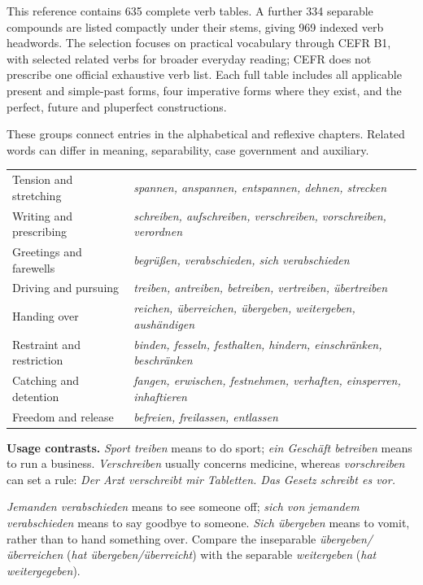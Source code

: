 \begin{tcolorbox}[colback=referenceBlueBg,colframe=genderMasculine,title={B1 coverage note}]
This reference contains 635 complete verb tables. A further 334 separable
compounds are listed compactly under their stems, giving 969 indexed verb
headwords. The selection focuses on practical vocabulary through CEFR B1,
with selected related verbs for broader everyday reading; CEFR
does not prescribe one official exhaustive verb list. Each full table includes
all applicable present and simple-past forms, four imperative forms where they
exist, and the perfect, future and pluperfect constructions.
\end{tcolorbox}

\begin{tcolorbox}[colback=white,colframe=genderMasculine,title={Related verbs to compare},fonttitle=\bfseries]
These groups connect entries in the alphabetical and reflexive chapters.
Related words can differ in meaning, separability, case government and auxiliary.

\smallskip
\begin{tabularx}{\linewidth}{@{}lX@{}}
Tension and stretching & \textit{spannen, anspannen, entspannen, dehnen, strecken}\\
Writing and prescribing & \textit{schreiben, aufschreiben, verschreiben, vorschreiben, verordnen}\\
Greetings and farewells & \textit{begrüßen, verabschieden, sich verabschieden}\\
Driving and pursuing & \textit{treiben, antreiben, betreiben, vertreiben, übertreiben}\\
Handing over & \textit{reichen, überreichen, übergeben, weitergeben, aushändigen}\\
Restraint and restriction & \textit{binden, fesseln, festhalten, hindern, einschränken, beschränken}\\
Catching and detention & \textit{fangen, erwischen, festnehmen, verhaften, einsperren, inhaftieren}\\
Freedom and release & \textit{befreien, freilassen, entlassen}\\
\end{tabularx}

\smallskip
\textbf{Usage contrasts.}
\textit{Sport treiben} means to do sport; \textit{ein Geschäft betreiben}
means to run a business. \textit{Verschreiben} usually concerns medicine,
whereas \textit{vorschreiben} can set a rule:
\textit{Der Arzt verschreibt mir Tabletten. Das Gesetz schreibt es vor.}

\textit{Jemanden verabschieden} means to see someone off;
\textit{sich von jemandem verabschieden} means to say goodbye to someone.
\textit{Sich übergeben} means to vomit, rather than to hand something over.
Compare the inseparable \textit{übergeben/überreichen}
(\textit{hat übergeben/überreicht}) with the separable \textit{weitergeben}
(\textit{hat weitergegeben}).
\end{tcolorbox}
